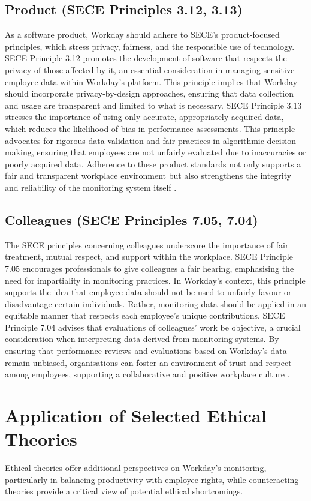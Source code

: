 \documentclass[a4paper]{article}
\begin{document}
\subsection{Product (SECE Principles 3.12, 3.13)}
As a software product, Workday should adhere to SECE’s product-focused principles, which stress privacy, fairness, and the responsible use of technology. SECE Principle 3.12 promotes the development of software that respects the privacy of those affected by it, an essential consideration in managing sensitive employee data within Workday’s platform. This principle implies that Workday should incorporate privacy-by-design approaches, ensuring that data collection and usage are transparent and limited to what is necessary. SECE Principle 3.13 stresses the importance of using only accurate, appropriately acquired data, which reduces the likelihood of bias in performance assessments. This principle advocates for rigorous data validation and fair practices in algorithmic decision-making, ensuring that employees are not unfairly evaluated due to inaccuracies or poorly acquired data. Adherence to these product standards not only supports a fair and transparent workplace environment but also strengthens the integrity and reliability of the monitoring system itself \citep{Sewell2012}.

\subsection{Colleagues (SECE Principles 7.05, 7.04)}
The SECE principles concerning colleagues underscore the importance of fair treatment, mutual respect, and support within the workplace. SECE Principle 7.05 encourages professionals to give colleagues a fair hearing, emphasising the need for impartiality in monitoring practices. In Workday’s context, this principle supports the idea that employee data should not be used to unfairly favour or disadvantage certain individuals. Rather, monitoring data should be applied in an equitable manner that respects each employee’s unique contributions. SECE Principle 7.04 advises that evaluations of colleagues’ work be objective, a crucial consideration when interpreting data derived from monitoring systems. By ensuring that performance reviews and evaluations based on Workday’s data remain unbiased, organisations can foster an environment of trust and respect among employees, supporting a collaborative and positive workplace culture \citep{Alge2006}.


\section{Application of Selected Ethical Theories}
Ethical theories offer additional perspectives on Workday’s monitoring, particularly in balancing productivity with employee rights, while counteracting theories provide a critical view of potential ethical shortcomings.
\end{document}
